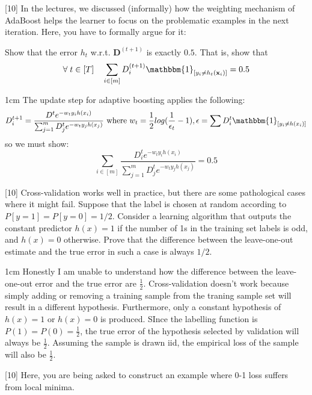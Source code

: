 \documentclass[11pt, fleqn]{exam}
\newenvironment{mathline}{\begin{adjustwidth}{1cm}{}}{\end{adjustwidth}}
\begin{document}
\begin{questions}
[10]
In the lectures, we discussed (informally) how the weighting mechanism of AdaBoost helps the learner to focus on the problematic examples in the next iteration. Here, you have to formally argue for it:

Show that the error $h_t$ w.r.t. $\mathbf{D}^{(t+1)}$ is exactly $0.5$. That is, show that
\begin{equation*}
\forall \; t \in [T] \quad \sum_{i \in [m]} D_i^{(t+1)}\mathbbm{1}_{[y_i \neq h_t(\mathbf{x}_i)]} = 0.5
\end{equation*}

\begin{mathline}
The update step for adaptive boosting applies the following:
$$D_i^{t+1}=\frac{D^te^{-w_ty_ih(x_i)}}{\sum_{j=1}^mD^t_je^{-w_ty_jh(x_j)}}\text{ where }w_t=\frac{1}{2}log(\frac{1}{\epsilon_t}-1),\epsilon=\sum D^t_i\mathbbm{1}_{[y_i\neq h(x_i)]}$$
so we must show:
$$\sum_{i\in[m]}\frac{D^t_ie^{-w_ty_ih(x_i)}}{\sum_{j=1}^mD^t_je^{-w_ty_jh(x_j)}}=0.5$$
\end{mathline}

[10]
Cross-validation works well in practice, but there are some pathological cases where it might fail. Suppose that the label is chosen at random according to $P[y = 1] = P[y = 0] = 1/2$. Consider a learning algorithm that outputs the constant predictor $h(x) = 1$ if the number of 1s in the training set labels is odd, and $h(x) = 0$ otherwise. Prove that the difference between the leave-one-out estimate and the true error in such a case is always $1/2$.

\begin{mathline}
Honestly I am unable to understand how the difference between the leave-one-out error and the true error are $\frac{1}{2}$. Cross-validation doesn't work because simply adding or removing a training sample from the traning sample set will result in a different hypothesis. Furthermore, only a constant hypothesis of $h(x)=1$ or $h(x)=0$ is produced. SInce the labelling function is $P(1)=P(0)=\frac{1}{2}$, the true error of the hypothesis selected by validation will always be $\frac{1}{2}$. Assuming the sample is drawn iid, the empirical loss of the sample will also be $\frac{1}{2}$.
\end{mathline}

[10]
Here, you are being asked to construct an example where 0-1 loss suffers from local minima.


\end{questions}
\end{document}
